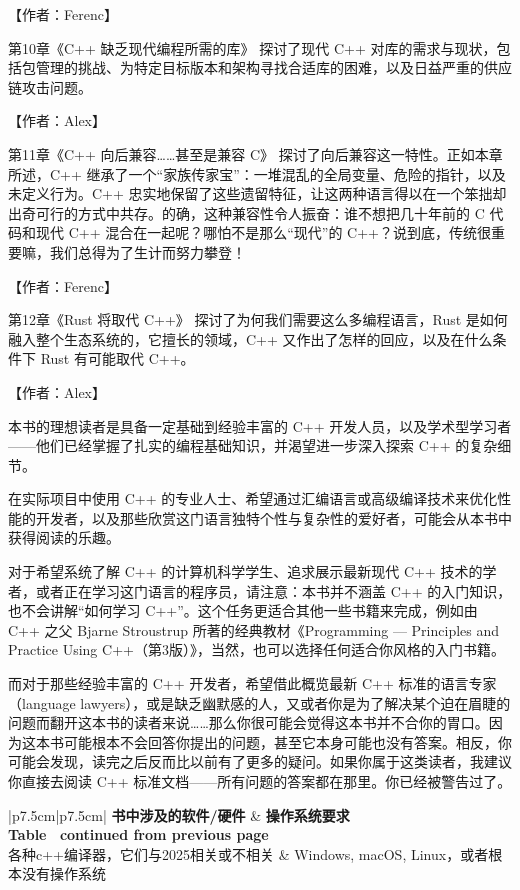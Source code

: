 【作者：Ferenc】

第10章《C++ 缺乏现代编程所需的库》 探讨了现代 C++ 对库的需求与现状，包括包管理的挑战、为特定目标版本和架构寻找合适库的困难，以及日益严重的供应链攻击问题。

【作者：Alex】

第11章《C++ 向后兼容……甚至是兼容 C》 探讨了向后兼容这一特性。正如本章所述，C++ 继承了一个“家族传家宝”：一堆混乱的全局变量、危险的指针，以及未定义行为。C++ 忠实地保留了这些遗留特征，让这两种语言得以在一个笨拙却出奇可行的方式中共存。的确，这种兼容性令人振奋：谁不想把几十年前的 C 代码和现代 C++ 混合在一起呢？哪怕不是那么“现代”的 C++？说到底，传统很重要嘛，我们总得为了生计而努力攀登！

【作者：Ferenc】

第12章《Rust 将取代 C++》 探讨了为何我们需要这么多编程语言，Rust 是如何融入整个生态系统的，它擅长的领域，C++ 又作出了怎样的回应，以及在什么条件下 Rust 有可能取代 C++。

【作者：Alex】


本书的理想读者是具备一定基础到经验丰富的 C++ 开发人员，以及学术型学习者——他们已经掌握了扎实的编程基础知识，并渴望进一步深入探索 C++ 的复杂细节。

在实际项目中使用 C++ 的专业人士、希望通过汇编语言或高级编译技术来优化性能的开发者，以及那些欣赏这门语言独特个性与复杂性的爱好者，可能会从本书中获得阅读的乐趣。

对于希望系统了解 C++ 的计算机科学学生、追求展示最新现代 C++ 技术的学者，或者正在学习这门语言的程序员，请注意：本书并不涵盖 C++ 的入门知识，也不会讲解“如何学习 C++”。这个任务更适合其他一些书籍来完成，例如由 C++ 之父 Bjarne Stroustrup 所著的经典教材《Programming — Principles and Practice Using C++（第3版）》，当然，也可以选择任何适合你风格的入门书籍。

而对于那些经验丰富的 C++ 开发者，希望借此概览最新 C++ 标准的语言专家（language lawyers），或是缺乏幽默感的人，又或者你是为了解决某个迫在眉睫的问题而翻开这本书的读者来说……那么你很可能会觉得这本书并不合你的胃口。因为这本书可能根本不会回答你提出的问题，甚至它本身可能也没有答案。相反，你可能会发现，读完之后反而比以前有了更多的疑问。如果你属于这类读者，我建议你直接去阅读 C++ 标准文档——所有问题的答案都在那里。你已经被警告过了。

\begin{longtable}{|p{7.5cm}|p{7.5cm}|}
\hline
\textbf{书中涉及的软件/硬件}          & \textbf{操作系统要求}               \\ \hline
\endfirsthead
%
%
{{\bfseries Table \thetable\ continued from previous page}} \\
\endhead
%
各种c++编译器，它们与2025相关或不相关 & Windows, macOS, Linux，或者根本没有操作系统 \\ \hline
\end{longtable}


